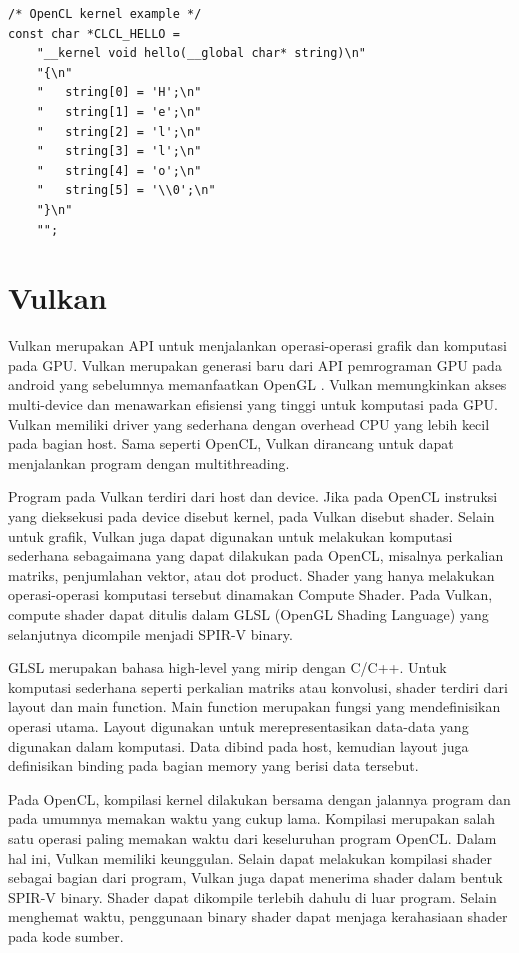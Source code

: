 \begin{lstlisting}[frame=single]
/* OpenCL kernel example */
const char *CLCL_HELLO =
    "__kernel void hello(__global char* string)\n"
    "{\n"
    "   string[0] = 'H';\n"
    "   string[1] = 'e';\n"
    "   string[2] = 'l';\n"
    "   string[3] = 'l';\n"
    "   string[4] = 'o';\n"
    "   string[5] = '\\0';\n"
    "}\n"
    "";
\end{lstlisting}

\section{Vulkan}
Vulkan merupakan API untuk menjalankan operasi-operasi grafik dan komputasi pada GPU. Vulkan merupakan generasi baru dari API pemrograman GPU pada android yang sebelumnya memanfaatkan OpenGL \cite{vkspec}. Vulkan memungkinkan akses multi-device dan menawarkan efisiensi yang tinggi untuk komputasi pada GPU. Vulkan memiliki driver yang sederhana dengan overhead CPU yang lebih kecil pada bagian host. Sama seperti OpenCL, Vulkan dirancang untuk dapat menjalankan program dengan multithreading.

Program pada Vulkan terdiri dari host dan device. Jika pada OpenCL instruksi yang dieksekusi pada device disebut kernel, pada Vulkan disebut shader. Selain untuk grafik, Vulkan juga dapat digunakan untuk melakukan komputasi sederhana sebagaimana yang dapat dilakukan pada OpenCL, misalnya perkalian matriks, penjumlahan vektor, atau dot product. Shader yang hanya melakukan operasi-operasi komputasi tersebut dinamakan Compute Shader. Pada Vulkan, compute shader dapat ditulis dalam GLSL (OpenGL Shading Language) yang selanjutnya dicompile menjadi SPIR-V binary. 

GLSL merupakan bahasa high-level yang mirip dengan C/C++. Untuk komputasi sederhana seperti perkalian matriks atau konvolusi, shader terdiri dari layout dan main function. Main function merupakan fungsi yang mendefinisikan operasi utama. Layout digunakan untuk merepresentasikan data-data yang digunakan dalam komputasi. Data dibind pada host, kemudian layout juga definisikan binding pada bagian memory yang berisi data tersebut.

Pada OpenCL, kompilasi kernel dilakukan bersama dengan jalannya program dan pada umumnya memakan waktu yang cukup lama. Kompilasi merupakan salah satu operasi paling memakan waktu dari keseluruhan program OpenCL. Dalam hal ini, Vulkan memiliki keunggulan. Selain dapat melakukan kompilasi shader sebagai bagian dari program, Vulkan juga dapat menerima shader dalam bentuk SPIR-V binary. Shader dapat dikompile terlebih dahulu di luar program. Selain menghemat waktu, penggunaan binary shader dapat menjaga kerahasiaan shader pada kode sumber.

